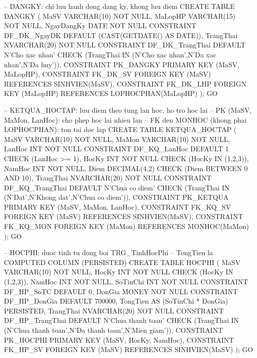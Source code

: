 \documentclass[13pt, a4paper]{article}
\begin{document}
\begin{sqlbox}
-- DANGKY: chi luu hanh dong dang ky, khong luu diem
CREATE TABLE DANGKY (
    MaSV       VARCHAR(10)  NOT NULL,
    MaLopHP    VARCHAR(15)  NOT NULL,
    NgayDangKy DATE         NOT NULL
               CONSTRAINT DF_DK_NgayDK DEFAULT (CAST(GETDATE() AS DATE)),
    TrangThai  NVARCHAR(20) NOT NULL
               CONSTRAINT DF_DK_TrangThai DEFAULT N'Cho xac nhan'
               CHECK (TrangThai IN (N'Cho xac nhan',N'Da xac nhan',N'Da huy')),
    CONSTRAINT PK_DANGKY PRIMARY KEY (MaSV, MaLopHP),
    CONSTRAINT FK_DK_SV  FOREIGN KEY (MaSV)    REFERENCES SINHVIEN(MaSV),
    CONSTRAINT FK_DK_LHP FOREIGN KEY (MaLopHP) REFERENCES LOPHOCPHAN(MaLopHP)
);
GO

-- KETQUA_HOCTAP: luu diem theo tung lan hoc, ho tro hoc lai
-- PK (MaSV, MaMon, LanHoc): cho phep hoc lai nhieu lan
-- FK den MONHOC (khong phai LOPHOCPHAN): ton tai doc lap
CREATE TABLE KETQUA_HOCTAP (
    MaSV      VARCHAR(10)  NOT NULL,
    MaMon     VARCHAR(10)  NOT NULL,
    LanHoc    INT          NOT NULL
              CONSTRAINT DF_KQ_LanHoc DEFAULT 1 CHECK (LanHoc >= 1),
    HocKy     INT          NOT NULL CHECK (HocKy IN (1,2,3)),
    NamHoc    INT          NOT NULL,
    Diem      DECIMAL(4,2)          CHECK (Diem BETWEEN 0 AND 10),
    TrangThai NVARCHAR(20) NOT NULL
              CONSTRAINT DF_KQ_TrangThai DEFAULT N'Chua co diem'
              CHECK (TrangThai IN (N'Dat',N'Khong dat',N'Chua co diem')),
    CONSTRAINT PK_KETQUA PRIMARY KEY (MaSV, MaMon, LanHoc),
    CONSTRAINT FK_KQ_SV  FOREIGN KEY (MaSV)  REFERENCES SINHVIEN(MaSV),
    CONSTRAINT FK_KQ_MON FOREIGN KEY (MaMon) REFERENCES MONHOC(MaMon)
);
GO

-- HOCPHI: duoc tinh tu dong boi TRG_TinhHocPhi
-- TongTien la COMPUTED COLUMN (PERSISTED)
CREATE TABLE HOCPHI (
    MaSV      VARCHAR(10)  NOT NULL,
    HocKy     INT          NOT NULL CHECK (HocKy IN (1,2,3)),
    NamHoc    INT          NOT NULL,
    SoTinChi  INT          NOT NULL CONSTRAINT DF_HP_SoTC   DEFAULT 0,
    DonGia    MONEY        NOT NULL CONSTRAINT DF_HP_DonGia DEFAULT 700000,
    TongTien  AS (SoTinChi * DonGia) PERSISTED,
    TrangThai NVARCHAR(20) NOT NULL
              CONSTRAINT DF_HP_TrangThai DEFAULT N'Chua thanh toan'
              CHECK (TrangThai IN (N'Chua thanh toan',N'Da thanh toan',N'Mien giam')),
    CONSTRAINT PK_HOCPHI PRIMARY KEY (MaSV, HocKy, NamHoc),
    CONSTRAINT FK_HP_SV  FOREIGN KEY (MaSV) REFERENCES SINHVIEN(MaSV)
);
GO
\end{sqlbox}
\end{document}
